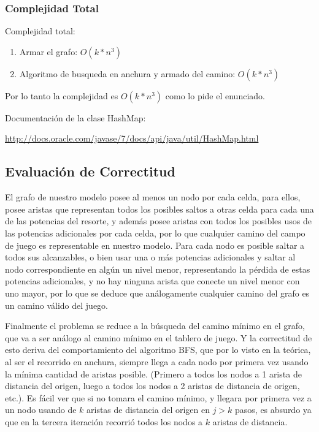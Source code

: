  \subsubsection{Complejidad Total}

 Complejidad total:
\begin{enumerate}

\item Armar el grafo: $O(k*n^3)$
\item Algoritmo de busqueda en anchura y armado del camino: $O(k*n^3)$
 \end{enumerate}
\vspace{2mm}
 Por lo tanto la complejidad es $O(k*n^3)$ como lo pide el enunciado.

\vspace{2mm}

Documentaci\'on de la clase HashMap:

 \url{http://docs.oracle.com/javase/7/docs/api/java/util/HashMap.html}

\subsection{Evaluaci\'on de Correctitud}

El grafo de nuestro modelo posee al menos un nodo por cada celda, para ellos, posee aristas que representan todos los posibles saltos a otras celda para cada una de las potencias del resorte, y adem\'as posee aristas con todos los posibles usos de las potencias adicionales por cada celda, por lo que cualquier camino del campo de juego es representable en nuestro modelo. Para cada nodo es posible saltar a todos sus alcanzables, o bien usar una o m\'as potencias adicionales y saltar al nodo correspondiente en alg\'un un nivel menor, representando la p\'erdida de estas potencias adicionales, y no hay ninguna arista que conecte un nivel menor con uno mayor, por lo que se deduce que an\'alogamente cualquier camino del grafo es un camino v\'alido del juego.

\vspace{2mm}

Finalmente el problema se reduce a la b\'usqueda del camino m\'inimo en el grafo, que va a ser an\'alogo al camino m\'inimo en el tablero de juego. Y la correctitud de esto deriva del comportamiento del algoritmo BFS, que por lo visto en la te\'orica, al ser el recorrido en anchura, siempre llega a cada nodo por primera vez usando la m\'inima cantidad de aristas posible. (Primero a todos los nodos a 1 arista de distancia del origen, luego a todos los nodos a 2 aristas de distancia de origen, etc.). Es f\'acil ver que si no tomara el camino m\'inimo, y llegara por primera vez a un nodo usando de $k$ aristas de distancia del origen en $j>k$ pasos, es absurdo ya que en la tercera iteraci\'on recorri\'o todos los nodos a $k$ aristas de distancia.

